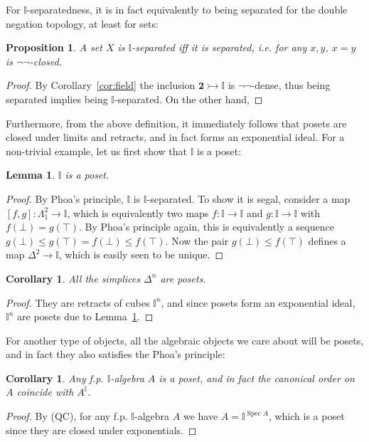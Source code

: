 \documentclass[12pt]{amsart}
\newtheorem{lemma}[theorem]{Lemma}
\newtheorem{corollary}[theorem]{Corollary}
\newtheorem{proposition}[theorem]{Proposition}
\theoremstyle{definition}
\newcommand{\mb}[1]{\mathbf{#1}}
\newcommand{\mbb}[1]{\mathbb{#1}}
\newcommand{\I}{\mbb I}
\newcommand{\inj}{\rightarrowtail}
\newcommand{\dneg}{\neg\neg}
\newcommand{\spec}{\operatorname{Spec}}
\begin{document}
For $\I$-separatedness, it is in fact equivalently to being separated for the double negation topology, at least for sets:

\begin{proposition}\label{prop:isepiffdnegclosed}
  A set $X$ is $\I$-separated iff it is separated, i.e. for any $x,y$, $x = y$ is $\dneg$-closed.
\end{proposition}
\begin{proof}
  By Corollary~\ref{cor:field} the inclusion $\mb 2 \inj \I$ is $\dneg$-dense, thus being separated implies being $\I$-separated. On the other hand, 
\end{proof}

Furthermore, from the above definition, it immediately follows that posets are closed under limits and retracts, and in fact forms an exponential ideal. For a non-trivial example, let us first show that $\I$ is a poset:

\begin{lemma}\label{lem:intervalposet}
  $\I$ is a poset.
\end{lemma}
\begin{proof}
  By Phoa's principle, $\I$ is $\I$-separated. To show it is segal, consider a map $[f,g] : \Lambda^2_1 \to \I$, which is equivalently two maps $f : \I \to \I$ and $g : \I \to \I$ with $f(\bot) = g(\top)$. By Phoa's principle again, this is equivalently a sequence $g(\bot) \le g(\top) = f(\bot) \le f(\top)$. Now the pair $g(\bot) \le f(\top)$ defines a map $\Delta^2 \to \I$, which is easily seen to be unique.
\end{proof}

\begin{corollary}
  All the simplices $\Delta^n$ are posets.
\end{corollary}
\begin{proof}
  They are retracts of cubes $\I^n$, and since posets form an exponential ideal, $\I^n$ are posets due to Lemma~\ref{lem:intervalposet}.
\end{proof}


For another type of objects, all the algebraic objects we care about will be posets, and in fact they also satisfies the Phoa's principle:

\begin{corollary}
  Any f.p. $\I$-algebra $A$ is a poset, and in fact the canonical order on $A$ coincide with $A^\I$.
\end{corollary}
\begin{proof}
  By (QC), for any f.p. $\I$-algebra $A$ we have $A = \I^{\spec A}$, which is a poset since they are closed under exponentials. 
\end{proof}
\end{document}
